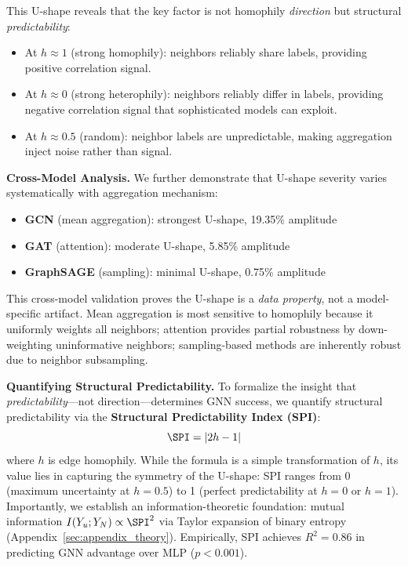This U-shape reveals that the key factor is not homophily \textit{direction} but structural \textit{predictability}:
\begin{itemize}
    \item At $h \approx 1$ (strong homophily): neighbors reliably share labels, providing positive correlation signal.
    \item At $h \approx 0$ (strong heterophily): neighbors reliably differ in labels, providing negative correlation signal that sophisticated models can exploit.
    \item At $h \approx 0.5$ (random): neighbor labels are unpredictable, making aggregation inject noise rather than signal.
\end{itemize}

\textbf{Cross-Model Analysis.} We further demonstrate that U-shape severity varies systematically with aggregation mechanism:
\begin{itemize}
    \item \textbf{GCN} (mean aggregation): strongest U-shape, 19.35\% amplitude
    \item \textbf{GAT} (attention): moderate U-shape, 5.85\% amplitude
    \item \textbf{GraphSAGE} (sampling): minimal U-shape, 0.75\% amplitude
\end{itemize}
This cross-model validation proves the U-shape is a \textit{data property}, not a model-specific artifact. Mean aggregation is most sensitive to homophily because it uniformly weights all neighbors; attention provides partial robustness by down-weighting uninformative neighbors; sampling-based methods are inherently robust due to neighbor subsampling.

\textbf{Quantifying Structural Predictability.} To formalize the insight that \textit{predictability}---not direction---determines GNN success, we quantify structural predictability via the \textbf{Structural Predictability Index (SPI)}:
\begin{equation}
    \SPI = |2h - 1|
\end{equation}
where $h$ is edge homophily. While the formula is a simple transformation of $h$, its value lies in capturing the symmetry of the U-shape: SPI ranges from 0 (maximum uncertainty at $h=0.5$) to 1 (perfect predictability at $h=0$ or $h=1$). Importantly, we establish an information-theoretic foundation: mutual information $I(Y_u; Y_N) \propto \SPI^2$ via Taylor expansion of binary entropy (Appendix~\ref{sec:appendix_theory}). Empirically, SPI achieves $R^2 = 0.86$ in predicting GNN advantage over MLP ($p < 0.001$).

